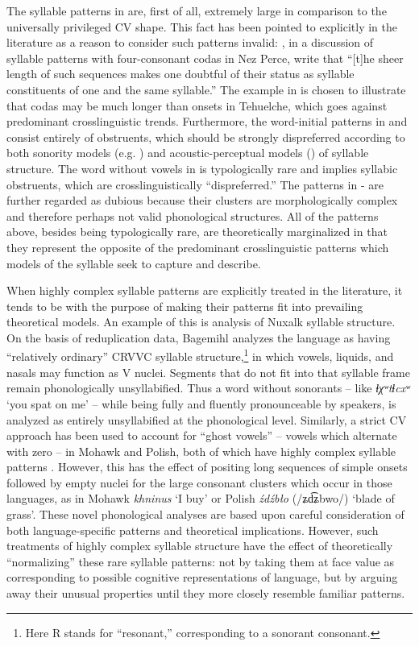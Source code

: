   The syllable patterns in  are, first of all, extremely large in comparison to the universally privileged CV shape. This fact has been pointed to explicitly in the literature as a reason to consider such patterns invalid: \citet[195]{KayeEtAl1990}, in a discussion of syllable patterns with four-consonant codas in Nez Perce, write that “[t]he sheer length of such sequences makes one doubtful of their status as syllable constituents of one and the same syllable.” The example in  is chosen to illustrate that codas may be much longer than onsets in Tehuelche, which goes against predominant crosslinguistic trends. Furthermore, the word-initial patterns in  and  consist entirely of obstruents, which should be strongly dispreferred according to both sonority models (e.g. \citealt{Clements1990}) and acoustic-perceptual models (\citealt{OhalaKawasaki-Fukumori1997}) of syllable structure. The word without vowels in  is typologically rare and implies syllabic obstruents, which are crosslinguistically ``dispreferred.'' The patterns in - are further regarded as dubious because their clusters are morphologically complex and therefore perhaps not valid phonological structures. All of the patterns above, besides being typologically rare, are theoretically marginalized in that they represent the opposite of the predominant crosslinguistic patterns which models of the syllable seek to capture and describe.

  When highly complex syllable patterns are explicitly treated in the literature, it tends to be with the purpose of making their patterns fit into prevailing theoretical models. An example of this is  analysis of Nuxalk syllable structure. On the basis of reduplication data, Bagemihl analyzes the language as having “relatively ordinary” CRVVC syllable structure,\footnote{{Here R stands for ``resonant,'' corresponding to a sonorant consonant.}} in which vowels, liquids, and nasals may function as V nuclei. Segments that do not fit into that syllable frame remain phonologically unsyllabified. Thus a word without sonorants -- like \textit{ɬχʷtɬcxʷ} ‘you spat on me’ -- while being fully and fluently pronounceable by speakers, is analyzed as entirely unsyllabified at the phonological level. Similarly, a strict CV approach has been used to account for ``ghost vowels'' -- vowels which alternate with zero -- in Mohawk and Polish, both of which have highly complex syllable patterns \citep{Rowicka1999}. However, this has the effect of positing long sequences of simple onsets followed by empty nuclei for the large consonant clusters which occur in those languages, as in Mohawk \textit{khninus} ‘I buy’ or Polish \textit{źdźbło} (/ʑd͡ʑbwo/) ‘blade of grass’. These novel phonological analyses are based upon careful consideration of both language-specific patterns and theoretical implications. However, such treatments of highly complex syllable structure have the effect of theoretically ``normalizing'' these rare syllable patterns: not by taking them at face value as corresponding to possible cognitive representations of language, but by arguing away their unusual properties until they more closely resemble familiar patterns.

